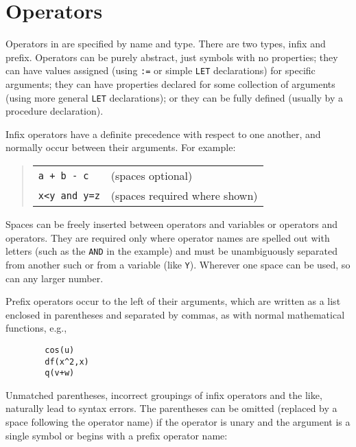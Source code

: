\section{Operators}
\label{sec-operators}

Operators in {\REDUCE} are specified by name and type.
There are two types, infix and prefix.
  Operators can be purely abstract, just symbols
with no properties; they can have values assigned (using \texttt{:=} or
simple \texttt{LET} declarations) for specific arguments; they can have
properties declared for some collection of arguments (using more general
\texttt{LET} declarations); or they can be fully defined (usually by a
procedure declaration).

Infix operators have a definite precedence with
respect to one another, and normally occur between their arguments.
For example:
\begin{quote}
\begin{tabular}{p{4cm}l}
\texttt{a + b - c} & (spaces optional) \\
\texttt{x<y and y=z} & (spaces required where shown)
\end{tabular}
\end{quote}
Spaces can be freely inserted between operators and variables or operators
and operators. They are required only where operator names are spelled out
with letters (such as the \texttt{AND} in the example) and must be unambiguously
separated from another such or from a variable (like \texttt{Y}). Wherever one
space can be used, so can any larger number.

Prefix operators occur to the left of their arguments, which are written as
a list enclosed in parentheses and separated by commas, as with normal
mathematical functions, e.g.,
\begin{verbatim}
        cos(u)
        df(x^2,x)
        q(v+w)
\end{verbatim}
Unmatched parentheses, incorrect groupings of infix operators
 and the like, naturally lead to syntax errors.  The
parentheses can be omitted (replaced by a space following the
operator name) if the operator is unary and the argument
is a single symbol or begins with a prefix operator name:

